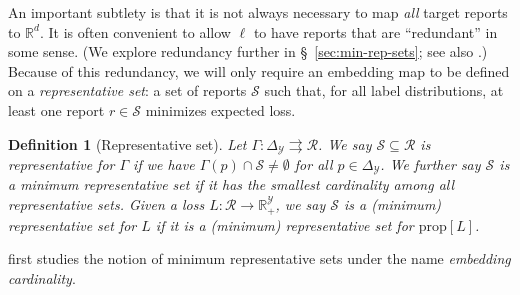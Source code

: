 \documentclass[11pt]{article}
\newcommand{\Comments}{1}
\newcommand{\mytodo}[2]{\ifnum\Comments=1%
  \todo[linecolor=#1!80!black,backgroundcolor=#1,bordercolor=#1!80!black]{#2}\fi}
\newcommand{\raft}[1]{\mytodo{green!20!white}{RF: #1}}
\newcommand{\reals}{\mathbb{R}}
\newcommand{\prop}[1]{\mathrm{prop}[#1]}
\newcommand{\simplex}{\Delta_\Y}
\newcommand{\R}{\mathcal{R}}
\newcommand{\Sc}{\mathcal{S}}
\newcommand{\Y}{\mathcal{Y}}
\newcommand{\toto}{\rightrightarrows}
\newtheorem{definition}{Definition}
\begin{document}
An important subtlety is that it is not always necessary to map \emph{all} target reports to $\reals^d$.
It is often convenient to allow $\ell$ to have reports that are ``redundant'' in some sense. (We explore redundancy further in \S~\ref{sec:min-rep-sets}; see also \citet{wang2020weston}.)
Because of this redundancy, we will only require an embedding map to be defined on a \emph{representative set}: a set of reports $\Sc$ such that, for all label distributions, at least one report $r\in\Sc$ minimizes expected loss.
\begin{definition}[Representative set]
  Let $\Gamma:\simplex\toto\R$.
  We say $\Sc \subseteq \R$ is \emph{representative for $\Gamma$} if we have $\Gamma(p) \cap \Sc \neq \emptyset$ for all $p\in \simplex$.
  We further say $\Sc$ is a \emph{minimum representative set} if it has the smallest cardinality among all representative sets.
  Given a loss $L:\R\to\reals^\Y_+$, we say $\Sc$ is a (minimum) representative set for $L$ if it is a (minimum) representative set for $\prop L$.
\end{definition}

\citet{wang2020weston} first studies the notion of minimum representative sets under the name \emph{embedding cardinality}.

\end{document}

